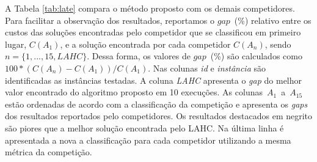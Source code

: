 \documentclass[cic,tc, twoside]{iiufrgs}
\begin{document}
A Tabela \ref{tab:late} compara o método proposto com os demais competidores. Para facilitar a observação dos resultados, reportamos o $gap$~{\scriptsize(\%)} relativo entre os custos das soluções encontradas pelo competidor que se classificou em primeiro lugar, $C(A_1)$, e a solução encontrada por cada competidor $C(A_n)$, sendo $n = \{1, ..., 15, LAHC\}$. Dessa forma, os valores de $gap$~{\scriptsize(\%)} são calculados como $100*(C(A_{n})-C(A_{1}))/C(A_{1})$.
Nas colunas \textit{id} e \textit{instância} são identificadas as instâncias testadas. A coluna \emph{LAHC} apresenta o \emph{gap} do melhor valor encontrado do algoritmo proposto em 10 execuções. As colunas~$A_1$~a~$A_{15}$ estão ordenadas de acordo com a classificação da competição e apresenta os \emph{gaps} dos resultados reportados pelo competidores. 
Os resultados destacados em negrito são piores que a melhor solução encontrada pelo LAHC. 
Na última linha é apresentada a nova a classificação para cada competidor utilizando a mesma métrica da competição.
\end{document}
